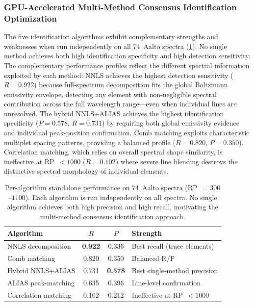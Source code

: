 \subsubsection{GPU-Accelerated Multi-Method Consensus Identification Optimization}
\label{sec:results-optimized}

The five identification algorithms exhibit complementary strengths and weaknesses when run independently on all 74~Aalto spectra (\cref{tab:standalone-algorithms}).
No single method achieves both high identification specificity and high detection sensitivity.
The complementary performance profiles reflect the different spectral information exploited by each method: NNLS achieves the highest detection sensitivity ($R = 0.922$) because full-spectrum decomposition fits the global Boltzmann emissivity envelope, detecting any element with non-negligible spectral contribution across the full wavelength range---even when individual lines are unresolved.
The hybrid NNLS+ALIAS achieves the highest identification specificity ($P = 0.578$, $R = 0.731$) by requiring both global emissivity evidence and individual peak-position confirmation.
Comb matching exploits characteristic multiplet spacing patterns, providing a balanced profile ($R = 0.820$, $P = 0.350$).
Correlation matching, which relies on overall spectral shape similarity, is ineffective at RP~$< 1000$ ($R = 0.102$) where severe line blending destroys the distinctive spectral morphology of individual elements.

\begin{table}[t]
  \centering
  \caption{Per-algorithm standalone performance on 74~Aalto spectra (RP~$= 300$--$1100$). Each algorithm is run independently on all spectra. No single algorithm achieves both high precision and high recall, motivating the multi-method consensus identification approach.}
  \label{tab:standalone-algorithms}
  \begin{tabular}{lccl}
    \toprule
    Algorithm & $R$ & $P$ & Strength \\
    \midrule
    NNLS decomposition      & \textbf{0.922} & 0.336 & Best recall (trace elements) \\
    Comb matching           & 0.820 & 0.350 & Balanced R/P \\
    Hybrid NNLS+ALIAS       & 0.731 & \textbf{0.578} & Best single-method precision \\
    ALIAS peak-matching     & 0.635 & 0.396 & Line-level confirmation \\
    Correlation matching    & 0.102 & 0.212 & Ineffective at RP~$< 1000$ \\
    \bottomrule
  \end{tabular}
\end{table}

